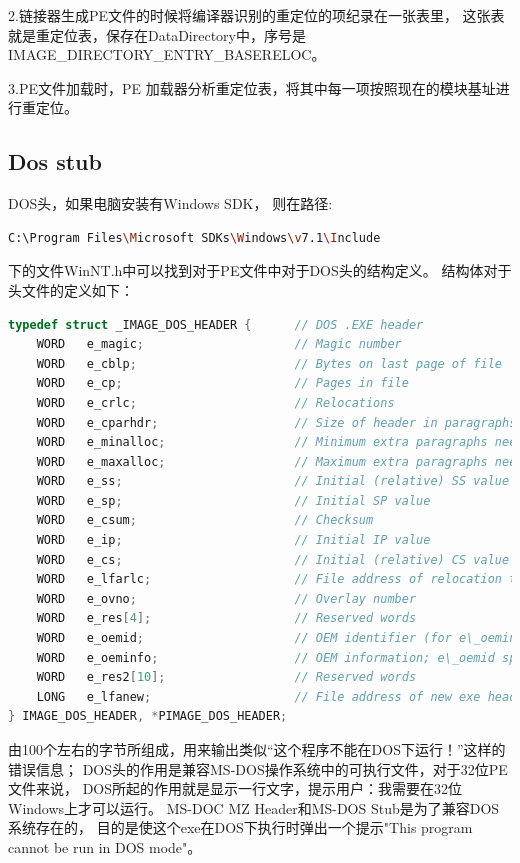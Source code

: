 \documentclass{book}
\begin{document}
2.链接器生成PE文件的时候将编译器识别的重定位的项纪录在一张表里，
这张表就是重定位表，保存在DataDirectory中，序号是 IMAGE\_DIRECTORY\_ENTRY\_BASERELOC。

3.PE文件加载时，PE 加载器分析重定位表，将其中每一项按照现在的模块基址进行重定位。

\subsection{Dos stub}DOS头，如果电脑安装有Windows SDK，
则在路径:

\begin{lstlisting}[language=Bash]
C:\Program Files\Microsoft SDKs\Windows\v7.1\Include
\end{lstlisting}

下的文件WinNT.h中可以找到对于PE文件中对于DOS头的结构定义。
结构体对于头文件的定义如下：

\begin{lstlisting}[language=C]
typedef struct _IMAGE_DOS_HEADER {      // DOS .EXE header
	WORD   e_magic;                     // Magic number
	WORD   e_cblp;                      // Bytes on last page of file
	WORD   e_cp;                        // Pages in file
	WORD   e_crlc;                      // Relocations
	WORD   e_cparhdr;                   // Size of header in paragraphs
	WORD   e_minalloc;                  // Minimum extra paragraphs needed
	WORD   e_maxalloc;                  // Maximum extra paragraphs needed
	WORD   e_ss;                        // Initial (relative) SS value
	WORD   e_sp;                        // Initial SP value
	WORD   e_csum;                      // Checksum
	WORD   e_ip;                        // Initial IP value
	WORD   e_cs;                        // Initial (relative) CS value
	WORD   e_lfarlc;                    // File address of relocation table
	WORD   e_ovno;                      // Overlay number
	WORD   e_res[4];                    // Reserved words
	WORD   e_oemid;                     // OEM identifier (for e\_oeminfo)
	WORD   e_oeminfo;                   // OEM information; e\_oemid specific
	WORD   e_res2[10];                  // Reserved words
	LONG   e_lfanew;                    // File address of new exe header
} IMAGE_DOS_HEADER, *PIMAGE_DOS_HEADER;
\end{lstlisting}

由100个左右的字节所组成，用来输出类似“这个程序不能在DOS下运行！”这样的错误信息；
DOS头的作用是兼容MS-DOS操作系统中的可执行文件，对于32位PE文件来说，
DOS所起的作用就是显示一行文字，提示用户：我需要在32位Windows上才可以运行。
MS-DOC MZ Header和MS-DOS Stub是为了兼容DOS系统存在的，
目的是使这个exe在DOS下执行时弹出一个提示"This program cannot be run in DOS mode"。
\end{document}
